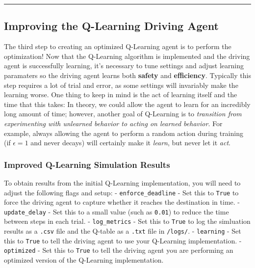 \documentclass[11pt]{article}
\begin{document}
    \begin{center}\rule{0.5\linewidth}{\linethickness}\end{center}

\hypertarget{improving-the-q-learning-driving-agent}{%
\subsection{Improving the Q-Learning Driving
Agent}\label{improving-the-q-learning-driving-agent}}

The third step to creating an optimized Q-Learning agent is to perform
the optimization! Now that the Q-Learning algorithm is implemented and
the driving agent is successfully learning, it's necessary to tune
settings and adjust learning paramaters so the driving agent learns both
\textbf{safety} and \textbf{efficiency}. Typically this step requires a
lot of trial and error, as some settings will invariably make the
learning worse. One thing to keep in mind is the act of learning itself
and the time that this takes: In theory, we could allow the agent to
learn for an incredibly long amount of time; however, another goal of
Q-Learning is to \emph{transition from experimenting with unlearned
behavior to acting on learned behavior}. For example, always allowing
the agent to perform a random action during training (if
\(\epsilon = 1\) and never decays) will certainly make it \emph{learn},
but never let it \emph{act}.

    \hypertarget{improved-q-learning-simulation-results}{%
\subsubsection{Improved Q-Learning Simulation
Results}\label{improved-q-learning-simulation-results}}

To obtain results from the initial Q-Learning implementation, you will
need to adjust the following flags and setup: -
\texttt{\textquotesingle{}enforce\_deadline\textquotesingle{}} - Set
this to \texttt{True} to force the driving agent to capture whether it
reaches the destination in time. -
\texttt{\textquotesingle{}update\_delay\textquotesingle{}} - Set this to
a small value (such as \texttt{0.01}) to reduce the time between steps
in each trial. -
\texttt{\textquotesingle{}log\_metrics\textquotesingle{}} - Set this to
\texttt{True} to log the simluation results as a \texttt{.csv} file and
the Q-table as a \texttt{.txt} file in \texttt{/logs/}. -
\texttt{\textquotesingle{}learning\textquotesingle{}} - Set this to
\texttt{\textquotesingle{}True\textquotesingle{}} to tell the driving
agent to use your Q-Learning implementation. -
\texttt{\textquotesingle{}optimized\textquotesingle{}} - Set this to
\texttt{\textquotesingle{}True\textquotesingle{}} to tell the driving
agent you are performing an optimized version of the Q-Learning
implementation.
\end{document}
